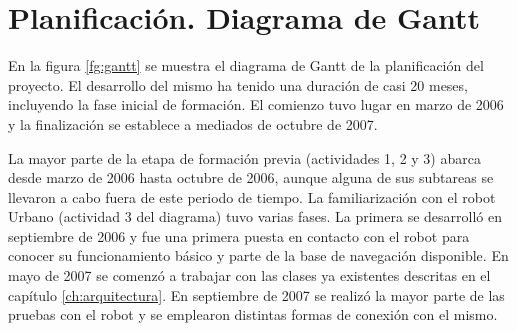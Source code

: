 
\chapter{Planificación. Diagrama de Gantt}\label{gantt}

En la figura \ref{fg:gantt} se muestra el diagrama de Gantt de la planificación del proyecto. El desarrollo del mismo ha tenido una duración de casi 20 meses, incluyendo la fase inicial de formación. El comienzo tuvo lugar en marzo de 2006 y la finalización se establece a mediados de octubre de 2007.

La mayor parte de la etapa de formación previa (actividades 1, 2 y 3) abarca desde marzo de 2006 hasta octubre de 2006, aunque alguna de sus subtareas se llevaron a cabo fuera de este periodo de tiempo. La familiarización con el robot Urbano (actividad 3 del diagrama) tuvo varias fases. La primera se desarrolló en septiembre de 2006 y fue una primera puesta en contacto con el robot para conocer su funcionamiento básico y parte de la base de navegación disponible. En mayo de 2007 se comenzó a trabajar con las clases ya existentes descritas en el capítulo \ref{ch:arquitectura}. En septiembre de 2007 se realizó la mayor parte de las pruebas con el robot y se emplearon distintas formas de conexión con el mismo.

